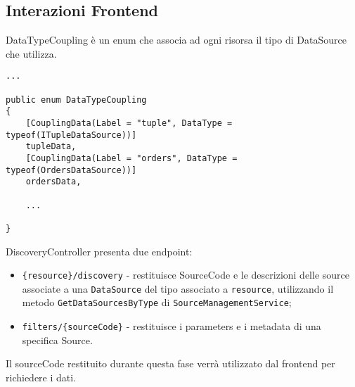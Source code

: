 \subsection{Interazioni Frontend}
\label{chap:frontend}
DataTypeCoupling è un enum che associa ad ogni risorsa il tipo di DataSource che utilizza.
\begin{lstlisting}[caption={DataTypeCoupling.cs}, style=sharpCode]
...

public enum DataTypeCoupling
{
    [CouplingData(Label = "tuple", DataType = typeof(ITupleDataSource))]
    tupleData,
    [CouplingData(Label = "orders", DataType = typeof(OrdersDataSource))]
    ordersData,

    ... 

}
\end{lstlisting}
DiscoveryController presenta due endpoint:
\begin{itemize}
\item \verb|{resource}/discovery| - restituisce SourceCode e le descrizioni delle source associate a una \verb|DataSource| del tipo associato a \verb|resource|, utilizzando il metodo \verb|GetDataSourcesByType| di \verb|SourceManagementService|;
\item \verb|filters/{sourceCode}| - restituisce i parameters e i metadata di una specifica Source.
\end{itemize}
Il sourceCode restituito durante questa fase verrà utilizzato dal frontend per richiedere i dati.

